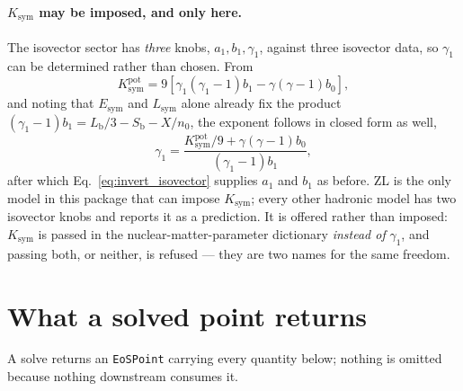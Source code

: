 \documentclass[aps,prc,onecolumn,superscriptaddress,nofootinbib,10pt]{revtex4-2}
\begin{document}
\paragraph{$K_{\mathrm{sym}}$ may be imposed, and only here.} The isovector
sector has \emph{three} knobs, $a_1, b_1, \gamma_1$, against three isovector
data, so $\gamma_1$ can be determined rather than chosen. From
%
\begin{equation}
K_{\mathrm{sym}}^{\mathrm{pot}}
  = 9 \left[ \gamma_1 (\gamma_1 - 1) b_1 - \gamma (\gamma - 1) b_0 \right] ,
\label{eq:ksym_pot}
\end{equation}
%
and noting that $E_{\mathrm{sym}}$ and $L_{\mathrm{sym}}$ alone already fix the
product $(\gamma_1 - 1) b_1 = L_{\mathrm{b}}/3 - S_{\mathrm{b}} - X/n_0$, the
exponent follows in closed form as well,
%
\begin{equation}
\gamma_1 = \frac{K_{\mathrm{sym}}^{\mathrm{pot}}/9
                 + \gamma (\gamma - 1) b_0}{(\gamma_1 - 1) b_1} ,
\label{eq:invert_gamma1}
\end{equation}
%
after which Eq.~\eqref{eq:invert_isovector} supplies $a_1$ and $b_1$ as before.
ZL is the only model in this package that can impose $K_{\mathrm{sym}}$; every
other hadronic model has two isovector knobs and reports it as a prediction.
It is offered rather than imposed: $K_{\mathrm{sym}}$ is passed in the
nuclear-matter-parameter dictionary \emph{instead of} $\gamma_1$, and passing
both, or neither, is refused --- they are two names for the same freedom.

\section{What a solved point returns}
\label{sec:returns}

A solve returns an \texttt{EoSPoint} carrying every quantity below; nothing is
omitted because nothing downstream consumes it.
\end{document}
